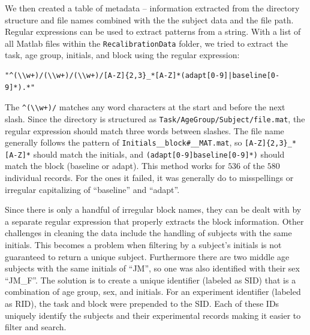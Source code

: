 \documentclass[11pt, oneside, openany]{scrbook}
\begin{document}
We then created a table of metadata -- information extracted from the directory structure and file names combined with the the subject data and the file path. Regular expressions can be used to extract patterns from a string. With a list of all Matlab files within the \texttt{RecalibrationData} folder, we tried to extract the task, age group, initials, and block using the regular expression:

\begin{verbatim}
"^(\\w+)/(\\w+)/(\\w+)/[A-Z]{2,3}_*[A-Z]*(adapt[0-9]|baseline[0-9]*).*"
\end{verbatim}

The \texttt{\^{}(\textbackslash{}\textbackslash{}w+)/} matches any word characters at the start and before the next slash. Since the directory is structured as \texttt{Task/AgeGroup/Subject/file.mat}, the regular expression should match three words between slashes. The file name generally follows the pattern of \texttt{Initials\_\_block\#\_\_MAT.mat}, so \texttt{{[}A-Z{]}\{2,3\}\_*{[}A-Z{]}*} should match the initials, and \texttt{(adapt{[}0-9{]}\textbar{}baseline{[}0-9{]}*)} should match the block (baseline or adapt). This method works for \(536\) of the \(580\) individual records. For the ones it failed, it was generally do to misspellings or irregular capitalizing of ``baseline'' and ``adapt''.

Since there is only a handful of irregular block names, they can be dealt with by a separate regular expression that properly extracts the block information. Other challenges in cleaning the data include the handling of subjects with the same initials. This becomes a problem when filtering by a subject's initials is not guaranteed to return a unique subject. Furthermore there are two middle age subjects with the same initials of ``JM'', so one was also identified with their sex ``JM\_F''. The solution is to create a unique identifier (labeled as SID) that is a combination of age group, sex, and initials. For an experiment identifier (labeled as RID), the task and block were prepended to the SID. Each of these IDs uniquely identify the subjects and their experimental records making it easier to filter and search.

\end{document}
